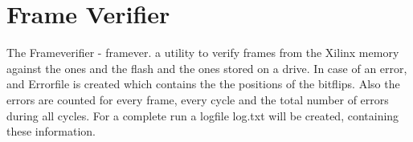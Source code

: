 \hypertarget{group__framever}{
\section{Frame Verifier}
\label{group__framever}
}
The Frameverifier - framever.  
a utility to verify frames from the Xilinx memory against the ones and the flash and the ones stored on a drive. In case of an error, and Errorfile is created which contains the the positions of the bitflips. Also the errors are counted for every frame, every cycle and the total number of errors during all cycles. For a complete run a logfile log.txt will be created, containing these information. 